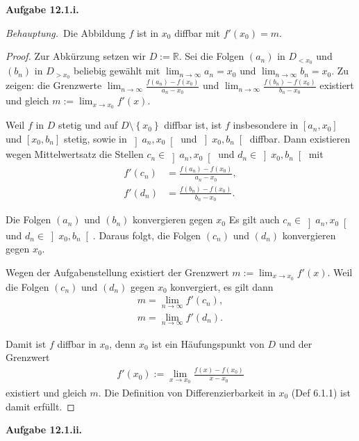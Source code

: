 \documentclass[12pt]{extarticle}
\newcommand{\beh}{\textit{Behauptung.}\ }
\newcommand{\aufgn}[1]{\textbf{Aufgabe #1.}}
\newcommand{\mg}[1]{\mathbb{#1}}
\begin{document}
\aufgn{12.1.i}

\beh Die Abbildung \(f\) ist in \(x_0\) diffbar mit $f'(x_0)
= m$.

\begin{proof}
  Zur Abkürzung setzen wir \(D := \mg{R}\).  Sei die
  Folgen \((a_n)\) in \(D_{< x_0}\) und \((b_n)\) in
  \(D_{> x_0}\) beliebig gewählt mit
  \(\lim_{n \to \infty}{a_n} = x_0\) und
  \(\lim_{n \to \infty}{b_n} = x_0\).  Zu zeigen: die
  Grenzwerte
  $\lim_{n \to \infty}{\frac{f(a_n) - f(x_0)}{a_n -
      x_0}}$ und
  $\lim_{n \to \infty}{\frac{f(b_n) - f(x_0)}{b_n -
      x_0}}$ existiert und gleich
  \(m := \lim_{x \to x_0}{f'(x)}\).

  Weil \(f\) in \(D\) stetig und auf
  \(D \setminus \left\{ x_0 \right\}\) diffbar ist, ist
  \(f\) insbesondere in \(\left[ a_n, x_0 \right]\) und
  \(\left[ x_0, b_n \right]\) stetig, sowie in
  \(\left] a_n, x_0 \right[\) und
  \(\left] x_0, b_n \right[\) diffbar.  Dann existieren
  wegen Mittelwertsatz die Stellen
  \(c_n \in \left] a_n, x_0 \right[\) und
  \(d_n \in \left] x_0, b_n \right[\) mit
\begin{align*}
  f'(c_n) &= \frac{f(a_n) - f(x_0)}{a_n - x_0}, \\
  f'(d_n) &= \frac{f(b_n) - f(x_0)}{b_n - x_0}.
\end{align*}

Die Folgen \((a_n)\) und \((b_n)\) konvergieren gegen \(x_0\)
Es gilt auch \(c_n \in \left] a_n, x_0 \right[\) und
\(d_n \in \left] x_0, b_n \right[\).  Daraus folgt, die
Folgen \((c_n)\) und \((d_n)\) konvergieren gegen \(x_0\).

Wegen der Aufgabenstellung existiert der Grenzwert $m :=
\lim_{x \to x_0}{f'(x)}$.  Weil die Folgen \((c_n)\) und
\((d_n)\) gegen \(x_0\) konvergiert, es gilt dann
\begin{align*}
  m = \lim_{n \to \infty}{f'(c_n)}, \\
  m = \lim_{n \to \infty}{f'(d_n)}.
\end{align*}

Damit ist \(f\) diffbar in \(x_0\), denn \(x_0\) ist ein
Häufungspunkt von \(D\) und der Grenzwert
\begin{align*}
f'(x_0) :=
\lim_{x \to x_0}{\frac{f(x) - f(x_0)}{x - x_0}}
\end{align*}
existiert und gleich \(m\).  Die Definition von
Differenzierbarkeit in \(x_0\) (Def 6.1.1) ist damit erfüllt.
\end{proof}

\aufgn{12.1.ii}
\end{document}
